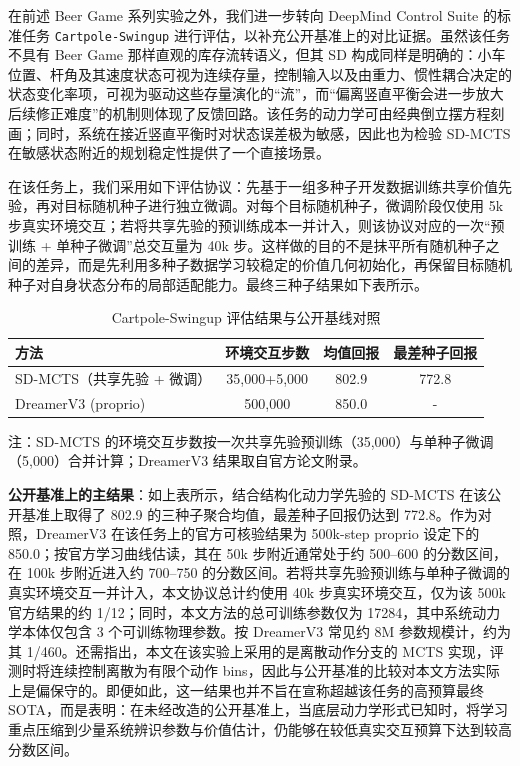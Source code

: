 \documentclass[UTF8]{ctexart}
\begin{document}
在前述 Beer Game 系列实验之外，我们进一步转向 DeepMind Control Suite 的标准任务 \texttt{Cartpole-Swingup}
进行评估，以补充公开基准上的对比证据。虽然该任务不具有 Beer Game 那样直观的库存流转语义，但其 SD 构成同样是明确的：小车位置、杆角及其速度状态可视为连续存量，控制输入以及由重力、惯性耦合决定的状态变化率项，可视为驱动这些存量演化的“流”，而“偏离竖直平衡会进一步放大后续修正难度”的机制则体现了反馈回路。该任务的动力学可由经典倒立摆方程刻画；同时，系统在接近竖直平衡时对状态误差极为敏感，因此也为检验
SD-MCTS 在敏感状态附近的规划稳定性提供了一个直接场景。

在该任务上，我们采用如下评估协议：先基于一组多种子开发数据训练共享价值先验，再对目标随机种子进行独立微调。对每个目标随机种子，微调阶段仅使用
5k 步真实环境交互；若将共享先验的预训练成本一并计入，则该协议对应的一次``预训练
+ 单种子微调''总交互量为 40k
步。这样做的目的不是抹平所有随机种子之间的差异，而是先利用多种子数据学习较稳定的价值几何初始化，再保留目标随机种子对自身状态分布的局部适配能力。最终三种子结果如下表所示。

\begin{table}[ht]
\centering
\caption{Cartpole-Swingup 评估结果与公开基线对照}
\begin{tabular}{l c c c}
\toprule
方法 & 环境交互步数 & 均值回报 & 最差种子回报 \\
\midrule
SD-MCTS（共享先验 + 微调） & 35,000+5,000 & 802.9 & 772.8 \\
DreamerV3 (proprio) & 500,000 & 850.0 & - \\
\bottomrule
\end{tabular}
\par\smallskip
{\small 注：SD-MCTS 的环境交互步数按一次共享先验预训练（35,000）与单种子微调（5,000）合并计算；DreamerV3 结果取自官方论文附录。}
\end{table}

\textbf{公开基准上的主结果}：如上表所示，结合结构化动力学先验的
SD-MCTS 在该公开基准上取得了 802.9 的三种子聚合均值，最差种子回报仍达到
772.8。作为对照，DreamerV3 在该任务上的官方可核验结果为 500k-step proprio 设定下的
850.0；按官方学习曲线估读，其在 50k 步附近通常处于约 500--600
的分数区间，在 100k 步附近进入约 700--750 的分数区间。若将共享先验预训练与单种子微调的真实环境交互一并计入，本文协议总计约使用
40k 步真实环境交互，仅为该 500k 官方结果的约
1/12；同时，本文方法的总可训练参数仅为 17284，其中系统动力学本体仅包含 3 个可训练物理参数。按
DreamerV3 常见约 8M 参数规模计，约为其
1/460。还需指出，本文在该实验上采用的是离散动作分支的 MCTS 实现，评测时将连续控制离散为有限个动作 bins，因此与公开基准的比较对本文方法实际上是偏保守的。即便如此，这一结果也并不旨在宣称超越该任务的高预算最终 SOTA，而是表明：在未经改造的公开基准上，当底层动力学形式已知时，将学习重点压缩到少量系统辨识参数与价值估计，仍能够在较低真实交互预算下达到较高分数区间。
\end{document}
